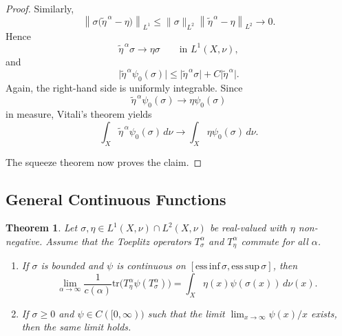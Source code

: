 \documentclass{amsart}
\newtheorem{thm}{Theorem}[section]
\theoremstyle{definition}
\theoremstyle{remark}
\numberwithin{equation}{section}
\newcommand{\tr}{\text{tr}} %
\newcommand{\calF}{\mathcal{F}}
\begin{document}
\begin{proof}
Similarly,
\[
\left\|
\sigma\bigl(\widetilde{\eta}^{\,\alpha}-\eta\bigr)
\right\|_{L^1}
\leq
\|\sigma\|_{L^2}
\left\|
\widetilde{\eta}^{\,\alpha}-\eta
\right\|_{L^2}
\longrightarrow0.
\]
Hence
\[
\widetilde{\eta}^{\,\alpha}\sigma
\longrightarrow
\eta\sigma
\qquad\text{in }L^1(X,\nu),
\]
and
\[
\bigl|
\widetilde{\eta}^{\,\alpha}\psi_0(\sigma)
\bigr|
\leq
\bigl|\widetilde{\eta}^{\,\alpha}\sigma\bigr|
+
C\bigl|\widetilde{\eta}^{\,\alpha}\bigr|.
\]
Again, the right-hand side is uniformly integrable. Since
\[
\widetilde{\eta}^{\,\alpha}\psi_0(\sigma)
\longrightarrow
\eta\psi_0(\sigma)
\]
in measure, Vitali's theorem yields
\[
\int_X
\widetilde{\eta}^{\,\alpha}\psi_0(\sigma)\,d\nu
\longrightarrow
\int_X\eta\psi_0(\sigma)\,d\nu.
\]

The squeeze theorem now proves the claim.
\end{proof}

\subsection{General Continuous Functions}

\begin{thm}\label{thm:general_szego_lc}
Let $\sigma,\eta\in L^1(X,\nu)\cap L^2(X,\nu)$ be real-valued with $\eta$ non-negative. Assume that the Toeplitz operators $T_\sigma^\alpha$ and $T_\eta^\alpha$ commute for all $\alpha$.

\begin{enumerate}
\item[(i)] If $\sigma$ is bounded and
$\psi$ is continuous on
$[\mathrm{ess\,inf}\,\sigma,\mathrm{ess\,sup}\,\sigma]$,
then
\[
\lim_{\alpha\to\infty}
\frac{1}{c(\alpha)}
\tr\!\big(T_\eta^\alpha \psi(T_\sigma^\alpha)\big)
=
\int_X \eta(x)\psi(\sigma(x))\, d\nu(x).
\]

\item[(ii)] If $\sigma\ge0$ and
$\psi\in C([0,\infty))$ such that the limit
$\lim_{x\to\infty}\psi(x)/x$ exists,
then the same limit holds.
\end{enumerate}
\end{thm}
\end{document}
